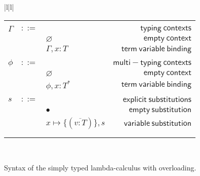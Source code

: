 \documentclass[preprint,authoryear,sort&compress,9pt,nocopyrightspace]{article}
\newcommand{\subxD}{x \mapsto \{(\overline{v:T})\},s}
\newcommand{\mtP}[1]{#1^{*}}
\newcommand{\emt}{\phi}
\begin{document}
\begin{figure}
\begin{small}
\begin{center}
\begin{tabular}{|l|l|}
\begin{tabular}{l c l r}
&&&\\
$\Gamma$&$::=$&&$\mathsf {typing \ contexts}$\\
&&$\varnothing$&$\mathsf {empty \ context}$\\
&&$\Gamma , x:T$&$\mathsf {term \ variable \ binding}$\\
&&&\\
$\emt$&$::=$&&$\mathsf {multi-typing \ contexts}$\\
&&$\varnothing$&$\mathsf {empty \ context}$\\
&&$\emt,x: \mtP{T}$&$\mathsf {term \ variable \ binding}$\\
&&&\\
$s$&$::=$&&$\mathsf {explicit \ substitutions}$\\
&&$ \bullet$&$\mathsf {empty \ substitution}$\\
&&$\subxD$&$\mathsf {variable \ substitution}$\\
&&&\\
&&&\\
\end{tabular}\\
\hline
\end{tabular}
\caption{Syntax of the simply typed lambda-calculus with overloading.}
\label{figure:sencilla}
\end{center}
\end{small}
\end{figure}
\end{document}
